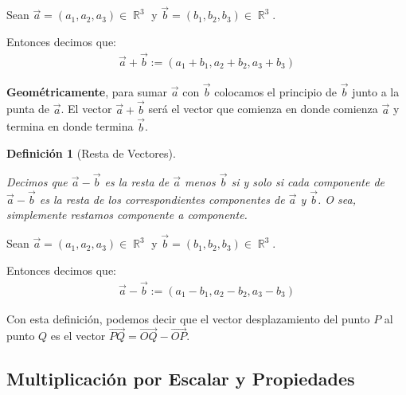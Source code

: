 \documentclass[12pt, fleqn]{report}                             %
\newtheorem{Definition}{Definición}[section]                    %
\theoremstyle{break}                                            %
\DeclareMathOperator \Reals        {\mathbb{R}}                 %
\newcommand{\lVec}[1]{\overrightarrow{#1}}                      %
\begin{document}
                Sean $\vec{a} = (a_1, a_2, a_3) \in \Reals^3$ y $\vec{b}=(b_1, b_2, b_3) \in \Reals^3$.

                Entonces decimos que:
                \begin{align}
                    \vec{a} + \vec{b} := (a_1 + b_1, a_2 + b_2, a_3 + b_3)
                \end{align}
            
                \textbf{Geométricamente}, para sumar $\vec{a}$ con $\vec{b}$ colocamos el principio de
                $\vec{b}$ junto a la punta de $\vec{a}$. El vector $\vec{a} + \vec{b}$ será el vector
                que comienza en donde comienza $\vec{a}$ y termina en donde termina $\vec{b}$.
                
                \vspace{2em}

                \begin{Definition}[Resta de Vectores]
                    \label{DefRestaVectores}

                    Decimos que $\vec{a}-\vec{b}$ es la resta de $\vec{a}$ menos $\vec{b}$ si y solo si 
                    cada componente de $\vec{a}-\vec{b}$ es la resta de los correspondientes componentes
                    de $\vec{a}$ y $\vec{b}$.
                    O sea, simplemente restamos componente a componente.
                    
                \end{Definition}

                Sean $\vec{a} = (a_1, a_2, a_3) \in \Reals^3$ y $\vec{b}=(b_1, b_2, b_3) \in \Reals^3$.

                Entonces decimos que:
                \begin{align}
                    \vec{a} - \vec{b} := (a_1 - b_1, a_2 - b_2, a_3 - b_3)
                \end{align}
            
                Con esta definición, podemos decir que el vector desplazamiento del punto $P$ al punto $Q$
                es el vector $\lVec{PQ} = \lVec{OQ} - \lVec{OP}$.
                
            \clearpage
            \subsection{Multiplicación por Escalar y Propiedades}
\end{document}
